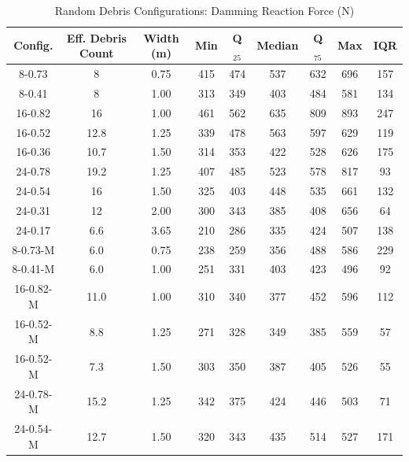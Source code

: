 \documentclass[10pt,a4paper]{article}
\begin{document}
\begin{table}[H]
\centering
\caption{Random Debris Configurations: Damming Reaction Force (N)}
\label{tab:data-ran-DAM} 
\begin{tabular}{ccccccccc}
\toprule
\textbf{Config.} & \textbf{Eff. Debris Count} & \textbf{Width (m)} & \textbf{Min} & \textbf{Q$_{25}$} & \textbf{Median} & \textbf{Q$_{75}$} & \textbf{Max} & \textbf{IQR} \\
\midrule
8-0.73  & 8   & 0.75 & 415 & 474 & 537 & 632 & 696 & 157 \\
8-0.41  & 8   & 1.00 & 313 & 349 & 403 & 484 & 581 & 134 \\
16-0.82 & 16 & 1.00 & 461 & 562 & 635 & 809 & 893 & 247 \\
16-0.52 & 12.8  & 1.25 & 339 & 478 & 563 & 597 & 629 & 119 \\
16-0.36  & 10.7   & 1.50 & 314 & 353 & 422 & 528 & 626 & 175 \\
24-0.78 & 19.2  & 1.25 & 407 & 485 & 523 & 578 & 817 & 93 \\
24-0.54 & 16  & 1.50 & 325 & 403 & 448 & 535 & 661 & 132 \\
24-0.31 & 12  & 2.00 & 300 & 343 & 385 & 408 & 656 & 64 \\
24-0.17 & 6.6   & 3.65 & 210 & 286 & 335 & 424 & 507 & 138 \\
8-0.73-M  & 6.0  & 0.75 & 238 & 259 & 356 & 488 & 586 & 229 \\
8-0.41-M  & 6.0  & 1.00 & 251 & 331 & 403 & 423 & 496 & 92 \\
16-0.82-M & 11.0 & 1.00 & 310 & 340 & 377 & 452 & 596 & 112 \\
16-0.52-M & 8.8  & 1.25 & 271 & 328 & 349 & 385 & 559 & 57 \\
16-0.52-M & 7.3  & 1.50 & 303 & 350 & 387 & 405 & 526 & 55 \\
24-0.78-M & 15.2 & 1.25 & 342 & 375 & 424 & 446 & 503 & 71 \\
24-0.54-M & 12.7 & 1.50 & 320 & 343 & 435 & 514 & 527 & 171 \\
\bottomrule
\end{tabular}
\end{table}
\end{document}
